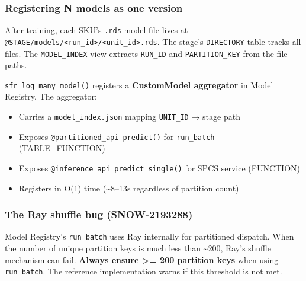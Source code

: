 \documentclass[
]{article}
\newenvironment{Shaded}{\begin{snugshade}}{\end{snugshade}}
\newcommand{\AttributeTok}[1]{\textcolor[rgb]{0.13,0.29,0.53}{#1}}
\newcommand{\FunctionTok}[1]{\textcolor[rgb]{0.13,0.29,0.53}{\textbf{#1}}}
\newcommand{\NormalTok}[1]{#1}
\newcommand{\OtherTok}[1]{\textcolor[rgb]{0.56,0.35,0.01}{#1}}
\newcommand{\SpecialCharTok}[1]{\textcolor[rgb]{0.81,0.36,0.00}{\textbf{#1}}}
\providecommand{\tightlist}{%
  \setlength{\itemsep}{0pt}\setlength{\parskip}{0pt}}
\begin{document}
\subsubsection{Registering N models as one
version}\label{registering-n-models-as-one-version}

After training, each SKU's \texttt{.rds} model file lives at
\texttt{@STAGE/models/\textless{}run\_id\textgreater{}/\textless{}unit\_id\textgreater{}.rds}.
The stage's \texttt{DIRECTORY} table tracks all files. The
\texttt{MODEL\_INDEX} view extracts \texttt{RUN\_ID} and
\texttt{PARTITION\_KEY} from the file paths.

\texttt{sfr\_log\_many\_model()} registers a \textbf{CustomModel
aggregator} in Model Registry. The aggregator:

\begin{itemize}
\tightlist
\item
  Carries a \texttt{model\_index.json} mapping \texttt{UNIT\_ID} → stage
  path
\item
  Exposes \texttt{@partitioned\_api\ predict()} for \texttt{run\_batch}
  (TABLE\_FUNCTION)
\item
  Exposes \texttt{@inference\_api\ predict\_single()} for SPCS service
  (FUNCTION)
\item
  Registers in O(1) time (\textasciitilde8--13s regardless of partition
  count)
\end{itemize}

\begin{Shaded}
\end{Shaded}

\subsubsection{The Ray shuffle bug
(SNOW-2193288)}\label{the-ray-shuffle-bug-snow-2193288}

Model Registry's \texttt{run\_batch} uses Ray internally for partitioned
dispatch. When the number of unique partition keys is much less than
\textasciitilde200, Ray's shuffle mechanism can fail. \textbf{Always
ensure \textgreater= 200 partition keys} when using \texttt{run\_batch}.
The reference implementation warns if this threshold is not met.
\end{document}

